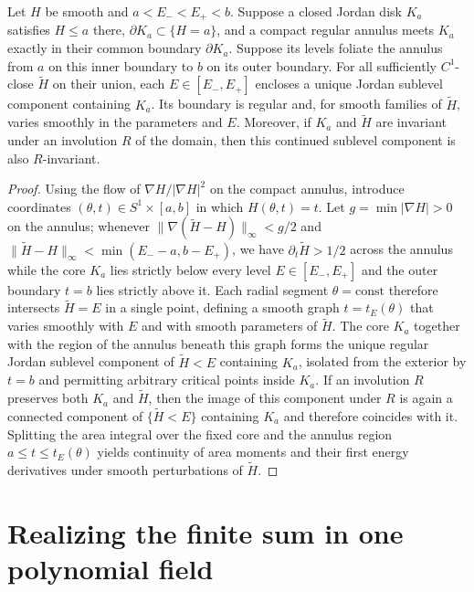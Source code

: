 \begin{lemma}\label{lem:disk-core}
Let $H$ be smooth and $a<E_-<E_+<b$. Suppose a closed Jordan disk $K_a$ satisfies $H\le a$ there, $\partial K_a\subset\{H=a\}$, and a compact regular annulus meets $K_a$ exactly in their common boundary $\partial K_a$. Suppose its levels foliate the annulus from $a$ on this inner boundary to $b$ on its outer boundary. For all sufficiently $C^1$-close $\widetilde H$ on their union, each $E\in[E_-,E_+]$ encloses a unique Jordan sublevel component containing $K_a$. Its boundary is regular and, for smooth families of $\widetilde H$, varies smoothly in the parameters and $E$. Moreover, if $K_a$ and $\widetilde H$ are invariant under an involution $R$ of the domain, then this continued sublevel component is also $R$-invariant.
\end{lemma}
\begin{proof}
Using the flow of $\nabla H/|\nabla H|^2$ on the compact annulus, introduce coordinates $(\theta,t)\in S^1\times[a,b]$ in which $H(\theta,t)=t$. Let $g=\min|\nabla H|>0$ on the annulus; whenever $\|\nabla(\widetilde H-H)\|_\infty<g/2$ and $\|\widetilde H-H\|_\infty<\min(E_--a,b-E_+)$, we have $\partial_t\widetilde H>1/2$ across the annulus while the core $K_a$ lies strictly below every level $E\in[E_-,E_+]$ and the outer boundary $t=b$ lies strictly above it. Each radial segment $\theta=\text{const}$ therefore intersects $\widetilde H=E$ in a single point, defining a smooth graph $t=t_E(\theta)$ that varies smoothly with $E$ and with smooth parameters of $\widetilde H$. The core $K_a$ together with the region of the annulus beneath this graph forms the unique regular Jordan sublevel component of $\widetilde H<E$ containing $K_a$, isolated from the exterior by $t=b$ and permitting arbitrary critical points inside $K_a$. If an involution $R$ preserves both $K_a$ and $\widetilde H$, then the image of this component under $R$ is again a connected component of $\{\widetilde H<E\}$ containing $K_a$ and therefore coincides with it. Splitting the area integral over the fixed core and the annulus region $a\le t\le t_E(\theta)$ yields continuity of area moments and their first energy derivatives under smooth perturbations of $\widetilde H$.
\end{proof}



\section{Realizing the finite sum in one polynomial field}\label{sec:joint-proof}

